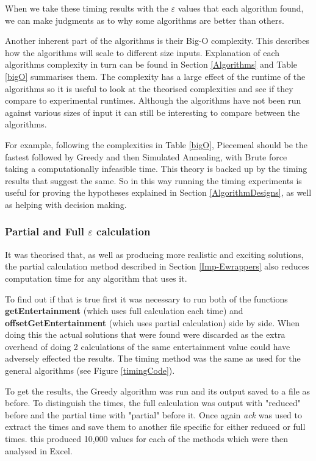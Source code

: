 \documentclass[12pt]{report}
\begin{document}
When we take these timing results with the $\varepsilon$ values that each algorithm found, we can make judgments as to why some algorithms are better than others.

Another inherent part of the algorithms is their Big-O complexity. This describes how the algorithms will scale to different size inputs. Explanation of each algorithms complexity in turn can be found in Section \ref{Algorithms} and Table \ref{bigO} summarises them. The complexity has a large effect of the runtime of the algorithms so it is useful to look at the theorised complexities and see if they compare to experimental runtimes. Although the algorithms have not been run against various sizes of input it can still be interesting to compare between the algorithms.

For example, following the complexities in Table \ref{bigO}, Piecemeal should be the fastest followed by Greedy and then Simulated Annealing, with Brute force taking a computationally infeasible time. This theory is backed up by the timing results that suggest the same. So in this way running the timing experiments is useful for proving the  hypotheses explained in Section \ref{AlgorithmDesigns}, as well as helping with decision making.

\subsubsection{Partial and Full $\varepsilon$ calculation}
It was theorised that, as well as producing more realistic and exciting solutions, the partial calculation method described in Section \ref{Imp-Ewrappers} also reduces computation time for any algorithm that uses it.

To find out if that is true first it was necessary to run both of the functions \textbf{getEntertainment} (which uses full calculation each time) and \textbf{offsetGetEntertainment} (which uses partial calculation) side by side. When doing this the actual solutions that were found were discarded as the extra overhead of doing 2 calculations of the same entertainment value could have adversely effected the results. The timing method was the same as used for the general algorithms (see Figure \ref{timingCode}).

To get the results, the Greedy algorithm was run and its output saved to a file as before. To distinguish the times, the full calculation was output with "reduced" before and the partial time with "partial" before it. Once again \textit{ack} was used to extract the times and save them to another file specific for either reduced or full times. this produced 10,000 values for each of the methods which were then analysed in Excel.
\end{document}
